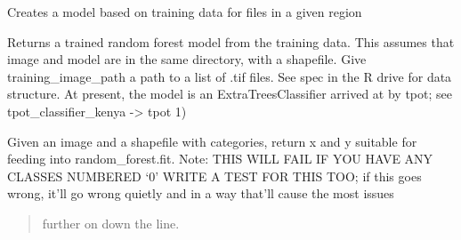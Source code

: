 \documentclass[letterpaper,10pt,english]{sphinxmanual}
\begin{document}

\begin{fulllineitems}
\label{\detokenize{index:pyeo.classification.create_model_for_region}}
Creates a model based on training data for files in a given region

\end{fulllineitems}


\begin{fulllineitems}
\label{\detokenize{index:pyeo.classification.create_trained_model}}
Returns a trained random forest model from the training data. This
assumes that image and model are in the same directory, with a shapefile.
Give training\_image\_path a path to a list of .tif files. See spec in the R drive for data structure.
At present, the model is an ExtraTreesClassifier arrived at by tpot; see tpot\_classifier\_kenya -\textgreater{} tpot 1)

\end{fulllineitems}


\begin{fulllineitems}
\label{\detokenize{index:pyeo.classification.get_training_data}}
Given an image and a shapefile with categories, return x and y suitable
for feeding into random\_forest.fit.
Note: THIS WILL FAIL IF YOU HAVE ANY CLASSES NUMBERED ‘0’
WRITE A TEST FOR THIS TOO; if this goes wrong, it’ll go wrong quietly and in a way that’ll cause the most issues
\begin{quote}

further on down the line.
\end{quote}

\end{fulllineitems}
\end{document}
